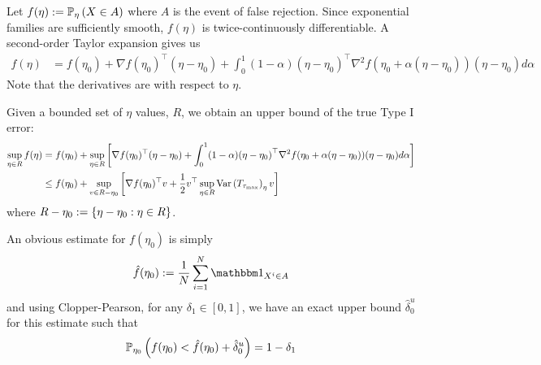 \documentclass[10pt]{article}
\begin{document}
Let $f(\eta) := \mathbb{P}_{\eta}\left(X \in A\right)$ 
where $A$ is the event of false rejection.
Since exponential families are sufficiently smooth,
$f(\eta)$ is twice-continuously differentiable.
A second-order Taylor expansion gives us
\begin{align*}
    f(\eta)
    &=
    f(\eta_0)
    + 
    \nabla f(\eta_0)^\top (\eta - \eta_0)
    +
    \int_0^1
    (1-\alpha)
    (\eta - \eta_0)^\top
    \nabla^2 f(\eta_0 + \alpha (\eta-\eta_0)) 
    (\eta - \eta_0) 
    d\alpha
\end{align*}
Note that the derivatives are with respect to $\eta$.

Given a bounded set of $\eta$ values, $R$,
we obtain an upper bound of the true Type I error:
\begin{align*}
    \sup\limits_{\eta \in R}
    f(\eta)
    &=
    f(\eta_0)
    +
    \sup\limits_{\eta \in R}
    \bracket{%
        \nabla f(\eta_0)^\top (\eta - \eta_0)
        +
        \int_0^1
        (1-\alpha)
        {(\eta - \eta_0)}^\top
        \nabla^2 f(\eta_0 + \alpha (\eta-\eta_0)) 
        (\eta - \eta_0) 
        d\alpha
    }
    \\&\leq
    f(\eta_0)
    +
    \sup\limits_{v \in R-\eta_0}
    \bracket{%
        \nabla f(\eta_0)^\top v
        +
        \frac{1}{2}
        v^\top
        \sup\limits_{\eta \in R} \var{T_{\tau_{\max}}}_{\eta}
        v 
    }
\end{align*}
where $R-\eta_0 := \{\eta-\eta_0 : \eta \in R\}$.

An obvious estimate for $f(\eta_0)$ is simply
\begin{align*}
    \hat{f}(\eta_0)
    :=
    \frac{1}{N}
    \sum\limits_{i=1}^N
    \indic{X^i \in A}
\end{align*}
and using Clopper-Pearson, for any $\delta_1 \in [0,1]$,
we have an exact upper bound $\hat{\delta}_0^u$ for this estimate such that
\begin{align*}
    \PPP_{\eta_0}\paren{%
        f(\eta_0) < \hat{f}(\eta_0) + \hat{\delta}_0^u
    }
    =
    1-\delta_1
\end{align*}
\end{document}
